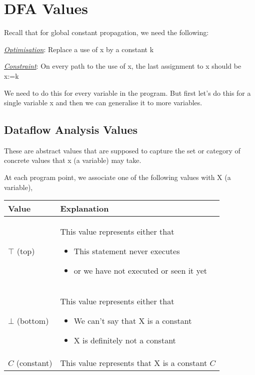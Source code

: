 \setlength{\parindent}{0pt}

\section{DFA Values}

Recall that for global constant propagation, we need the following:

\vspace{0.3cm}

\underline{\textit{Optimisation}}: Replace a use of x by a constant k

\underline{\textit{Constraint}}: On every path to the use of x, the last assignment to x should be x:=k

\vspace{0.3cm}

We need to do this for every variable in the program. But first let's do this for a single variable x and then we can generalise it to more variables.

\subsection{Dataflow Analysis Values}

These are abstract values that are supposed to capture the set or category of concrete values that x (a variable) may take.

\vspace{0.5cm}

At each program point, we associate one of the following values with X (a variable),
\begin{center}
    \begin{tabular}{| m{2cm} | m{7cm} |}
        \hline
        Value & Explanation \\
        \hline
        $\top$ (top) &
        This value represents either that
        \begin{itemize} 
            \item This statement never executes
            \item or we have not executed or seen it yet
        \end{itemize}\\
        \hline
        $\bot$ (bottom) &
        This value represents either that
        \begin{itemize} 
            \item We can't say that X is a constant
            \item X is definitely not a constant
        \end{itemize}\\
        \hline
        $C$ (constant) &
        This value represents that X is a constant $C$\\
        \hline
    \end{tabular}
\end{center}

